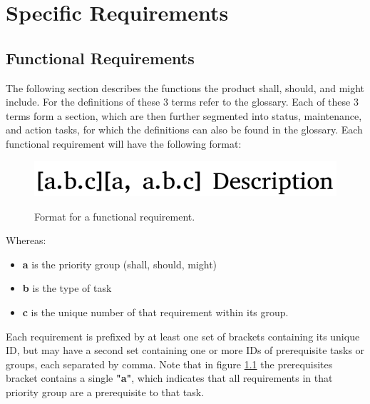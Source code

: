 \chapter{Specific Requirements}
\label{ch:specific_requirements}

\section{Functional Requirements}
The following section describes the functions the product shall, should, and might include. For the definitions of these 3 terms refer to the glossary. Each of these 3 terms form a section, which are then further segmented into status, maintenance, and action tasks, for which the definitions can also be found in the glossary. Each functional requirement will have the following format:
\begin{figure}[h]
	\centering
	\includegraphics[width=\linewidth]{img/func_req_format.png}
	\label{fig:func_req_format}
	\caption{Format for a functional requirement.}
\end{figure}

\noindent
Whereas:
\begin{itemize}
	\item \textbf{a} is the priority group (shall, should, might)
	\item \textbf{b} is the type of task
	\item \textbf{c} is the unique number of that requirement within its group.
\end{itemize}
Each requirement is prefixed by at least one set of brackets containing its unique ID, but may have a second set containing one or more IDs of prerequisite tasks or groups, each separated by comma. Note that in figure \ref{fig:func_req_format} the prerequisites bracket contains a single \textbf{"a"}, which indicates that all requirements in that priority group are a prerequisite to that task.\\\\

